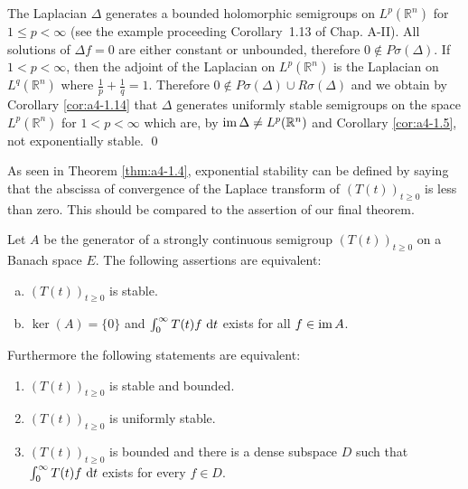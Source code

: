 \begin{example}\label{ex:a4-15}
The Laplacian $\Delta$ generates a bounded holomorphic semigroups on $L^{p}(\mathbb{R}^{n})$ for $1 \leq p < \infty$ (see the example proceeding
Corollary~1.13 of Chap. A-II). 
All solutions of $\Delta f = 0$ are either constant
or unbounded, therefore $0 \not\in P\sigma(\Delta)$. 
If $1 < p < \infty$, then the adjoint
of the Laplacian on $L^{p}(\mathbb{R}^{n})$ is the Laplacian on $L^{q}(\mathbb{R}^{n})$ where
$\frac{1}{p} + \frac{1}{q} = 1$. 
Therefore $0 \not\in P\sigma(\Delta) \cup R\sigma(\Delta)$ and we obtain by Corollary \ref{cor:a4-1.14}
that $\Delta$ generates uniformly stable semigroups on the space $L^{p}(\mathbb{R}^{n})$
for $1 < p < \infty$ which are, by $\mathop{}\!\mathrm{im}\, \Delta \not= L^{p}(\mathbb{R}^{n})$ and Corollary \ref{cor:a4-1.5}, not exponentially stable. \qed
\end{example}
\noindent
As seen in Theorem \ref{thm:a4-1.4}, exponential stability can be defined by saying that the abscissa of convergence of the Laplace transform of $(T(t))_{t \geq 0}$ is less than zero. 
This should be compared to the assertion of our final theorem.

\begin{theorem}\label{thm:a4-1.16}
Let $A$ be the generator of a strongly continuous semigroup $(T(t))_{t \geq 0}$ on a Banach space $E$. 
The following assertions are equivalent:
\begin{enumerate}[(a)]
\item $(T(t))_{t \geq 0}$ is stable.
\item $\ker(A) = \{0\}$ and $\int_{0}^{\infty} T(t)f \,\mathop{}\!\mathrm{d}{t}$ exists for all $f \in \mathop{}\!\mathrm{im}\, A$.
\end{enumerate}
Furthermore the following statements are equivalent:
\begin{enumerate}[(a$'$)]
\item $(T(t))_{t \geq 0}$ is stable and bounded.
\item $(T(t))_{t \geq 0}$ is uniformly stable.
\item $(T(t))_{t \geq 0}$ is bounded and there is a dense subspace $D$ such that $\int_{0}^{\infty} T(t)f \,\mathop{}\!\mathrm{d}{t}$ exists for every $f \in D$.
\end{enumerate}
\end{theorem}

